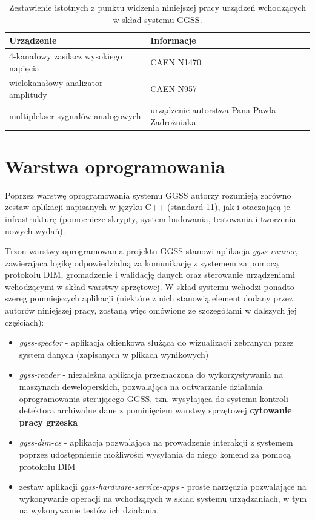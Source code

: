 \clearpage

\begin{table}[htbp]
\centering
\caption{Zestawienie istotnych z punktu widzenia niniejszej pracy urządzeń wchodzących w skład systemu GGSS.}
\label{tab:devices}
\begin{tabularx}{\textwidth}{@{}XX@{}}
\toprule
Urządzenie &
Informacje \\
\midrule
4-kanałowy zasilacz wysokiego napięcia & CAEN N1470 \\
wielokanałowy analizator amplitudy & CAEN N957 \\
multiplekser sygnałów analogowych & urządzenie autorstwa Pana Pawła Zadrożniaka\\
\bottomrule
\end{tabularx}
\end{table}


\section{Warstwa oprogramowania}
Poprzez warstwę oprogramowania systemu GGSS autorzy rozumieją zarówno zestaw aplikacji napisanych w języku C++ (standard 11), jak i otaczającą je infrastrukturę (pomocnicze skrypty, system budowania, testowania i tworzenia nowych wydań). 


Trzon warstwy oprogramowania projektu GGSS stanowi aplikacja \emph{ggss-runner}, zawierająca logikę odpowiedzialną za komunikację z systemem za pomocą protokołu DIM, gromadzenie i walidację danych oraz sterowanie urządzeniami wchodzącymi w skład warstwy sprzętowej. W skład systemu wchodzi ponadto szereg pomniejszych aplikacji (niektóre z nich stanowią element dodany przez autorów niniejszej pracy, zostaną więc omówione ze szczegółami w dalszych jej częściach):
\begin{itemize}
    \item \emph{ggss-spector} - aplikacja okienkowa służąca do wizualizacji zebranych przez system danych (zapisanych w plikach wynikowych)
    \item \emph{ggss-reader} - niezależna aplikacja przeznaczona do wykorzystywania na maszynach deweloperskich, pozwalająca na odtwarzanie działania oprogramowania sterującego GGSS, tzn. wysyłająca do systemu kontroli detektora archiwalne dane z pominięciem warstwy sprzętowej \textbf{cytowanie pracy grzeska}
    \item \emph{ggss-dim-cs} - aplikacja pozwalająca na prowadzenie interakcji z systemem poprzez udostępnienie możliwości wysyłania do niego komend za pomocą protokołu DIM
    \item zestaw aplikacji \emph{ggss-hardware-service-apps} - proste narzędzia pozwalające na wykonywanie operacji na wchodzących w skład systemu urządzaniach, w tym na wykonywanie testów ich działania. 
\end{itemize}


